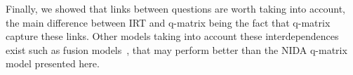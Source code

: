 \documentclass{sig-alternate}
\begin{document}
Finally, we showed that links between questions are worth taking into account, the main difference between IRT and q-matrix being the fact that q-matrix capture these links. Other models taking into account these interdependences exist such as fusion models~\citep{McGlohen2008}, that may perform better than the NIDA q-matrix model presented here.








%

%
%

\end{document}
